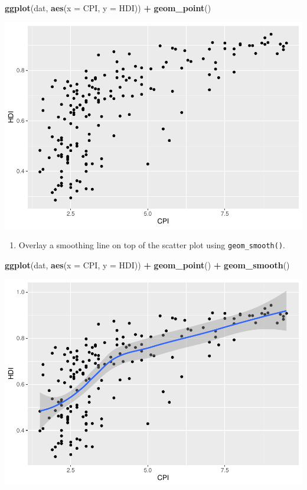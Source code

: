 \documentclass[
]{book}
\newenvironment{Shaded}{\begin{snugshade}}{\end{snugshade}}
\newcommand{\DataTypeTok}[1]{\textcolor[rgb]{0.13,0.29,0.53}{#1}}
\newcommand{\KeywordTok}[1]{\textcolor[rgb]{0.13,0.29,0.53}{\textbf{#1}}}
\newcommand{\NormalTok}[1]{#1}
\newcommand{\OperatorTok}[1]{\textcolor[rgb]{0.81,0.36,0.00}{\textbf{#1}}}
\newcommand{\StringTok}[1]{\textcolor[rgb]{0.31,0.60,0.02}{#1}}
\providecommand{\tightlist}{%
  \setlength{\itemsep}{0pt}\setlength{\parskip}{0pt}}
\begin{document}
\begin{Shaded}
\begin{Highlighting}[]
\KeywordTok{ggplot}\NormalTok{(dat, }\KeywordTok{aes}\NormalTok{(}\DataTypeTok{x =}\NormalTok{ CPI, }\DataTypeTok{y =}\NormalTok{ HDI)) }\OperatorTok{+}
\StringTok{  }\KeywordTok{geom\_point}\NormalTok{()}
\end{Highlighting}
\end{Shaded}

\includegraphics{R/Rgraphics/figures/unnamed-chunk-192-1.pdf}

\begin{enumerate}
\def\labelenumi{\arabic{enumi}.}
\setcounter{enumi}{1}
\tightlist
\item
  Overlay a smoothing line on top of the scatter plot using \texttt{geom\_smooth()}.
\end{enumerate}

\begin{Shaded}
\begin{Highlighting}[]
\KeywordTok{ggplot}\NormalTok{(dat, }\KeywordTok{aes}\NormalTok{(}\DataTypeTok{x =}\NormalTok{ CPI, }\DataTypeTok{y =}\NormalTok{ HDI)) }\OperatorTok{+}
\StringTok{  }\KeywordTok{geom\_point}\NormalTok{() }\OperatorTok{+}
\StringTok{  }\KeywordTok{geom\_smooth}\NormalTok{()}
\end{Highlighting}
\end{Shaded}

\includegraphics{R/Rgraphics/figures/unnamed-chunk-193-1.pdf}
\end{document}
